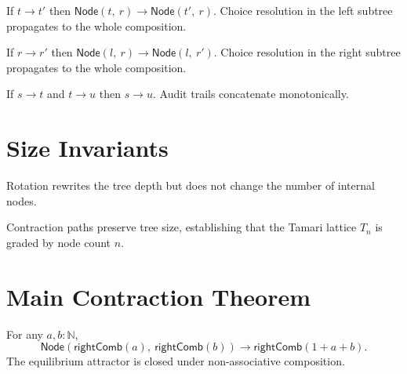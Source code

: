 \begin{lemma}
\label{lem:node_left}
\leanok
{}
If $t \to t'$ then $\mathsf{Node}(t,\ r) \to \mathsf{Node}(t',\ r)$.
Choice resolution in the left subtree propagates to the whole composition.
\end{lemma}

\begin{lemma}
\label{lem:node_right}
\leanok
{}
If $r \to r'$ then $\mathsf{Node}(l,\ r) \to \mathsf{Node}(l,\ r')$.
Choice resolution in the right subtree propagates to the whole composition.
\end{lemma}

\begin{lemma}
\label{lem:trans}
\leanok
{}
If $s \to t$ and $t \to u$ then $s \to u$.
Audit trails concatenate monotonically.
\end{lemma}

\section{Size Invariants}

\begin{lemma}
\label{lem:size_one}
\leanok
{}
Rotation rewrites the tree depth but does not change the number of internal nodes.
\end{lemma}

\begin{lemma}
\label{lem:size_multi}
\leanok
{}
Contraction paths preserve tree size, establishing that the Tamari lattice $T_n$ is graded by node count $n$.
\end{lemma}

\section{Main Contraction Theorem}

\begin{lemma}
\label{lem:node_rightcombs}
\leanok
{}
For any $a, b : \mathbb{N}$,
\[
\mathsf{Node}(\mathsf{rightComb}(a),\ \mathsf{rightComb}(b)) \longrightarrow \mathsf{rightComb}(1 + a + b).
\]
The equilibrium attractor is closed under non-associative composition.
\end{lemma}

